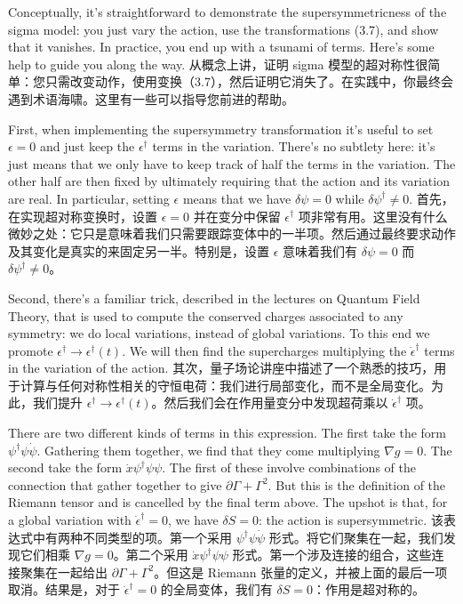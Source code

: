 \documentclass{article}
\begin{document}
\begin{paracol}{2}
Conceptually, it’s straightforward to demonstrate the supersymmetricness of the sigma model: you just vary the action, use the transformations (3.7), and show that it vanishes. In practice, you end up with a tsunami of terms. Here’s some help to guide you along the way.
\switchcolumn
从概念上讲，证明 sigma 模型的超对称性很简单：您只需改变动作，使用变换（3.7），然后证明它消失了。在实践中，你最终会遇到术语海啸。这里有一些可以指导您前进的帮助。
\switchcolumn*

First, when implementing the supersymmetry transformation it’s useful to set $\epsilon = 0$ and just keep the $\epsilon^{\dagger}$ terms in the variation. There’s no subtlety here: it’s just means that we only have to keep track of half the terms in the variation. The other half are then fixed by ultimately requiring that the action and its variation are real. In particular, setting $\epsilon$ means that we have $\delta \psi = 0$ while $\delta \psi^{\dagger} \neq 0$.
\switchcolumn
首先，在实现超对称变换时，设置 $\epsilon = 0$ 并在变分中保留 $\epsilon^{\dagger}$ 项非常有用。这里没有什么微妙之处：它只是意味着我们只需要跟踪变体中的一半项。然后通过最终要求动作及其变化是真实的来固定另一半。特别是，设置 $\epsilon$ 意味着我们有 $\delta \psi = 0$ 而 $\delta \psi^{\dagger} \neq 0$。
\switchcolumn*

Second, there’s a familiar trick, described in the lectures on Quantum Field Theory, that is used to compute the conserved charges associated to any symmetry: we do local variations, instead of global variations. To this end we promote $\epsilon^{\dagger} \to \epsilon^{\dagger}(t)$. We will then ﬁnd the supercharges multiplying the $\dot{\epsilon}^{\dagger}$ terms in the variation of the action.
\switchcolumn
其次，量子场论讲座中描述了一个熟悉的技巧，用于计算与任何对称性相关的守恒电荷：我们进行局部变化，而不是全局变化。为此，我们提升 $\epsilon^{\dagger} \to \epsilon^{\dagger}(t)$。然后我们会在作用量变分中发现超荷乘以 $\dot{\epsilon}^{\dagger}$ 项。
\switchcolumn*

There are two diﬀerent kinds of terms in this expression. The ﬁrst take the form $\psi^{\dagger} \psi \dot{\psi}$. Gathering them together, we ﬁnd that they come multiplying $\nabla g = 0$. The second take the form $\dot{x} \psi^{\dagger} \psi \psi$. The ﬁrst of these involve combinations of the connection that gather together to give $\partial \Gamma + \Gamma^2$. But this is the deﬁnition of the Riemann tensor and is cancelled by the ﬁnal term above. The upshot is that, for a global variation with $\dot{\epsilon}^{\dagger} = 0$, we have $\delta S = 0$: the action is supersymmetric.
\switchcolumn
该表达式中有两种不同类型的项。第一个采用 $\psi^{\dagger} \psi \dot{\psi}$ 形式。将它们聚集在一起，我们发现它们相乘 $\nabla g = 0$。第二个采用 $\dot{x} \psi^{\dagger} \psi \psi$ 形式。第一个涉及连接的组合，这些连接聚集在一起给出 $\partial \Gamma + \Gamma^2$。但这是 Riemann 张量的定义，并被上面的最后一项取消。结果是，对于 $\dot{\epsilon}^{\dagger} = 0$ 的全局变体，我们有 $\delta S = 0$：作用是超对称的。
\switchcolumn*


\end{paracol}
\end{document}
